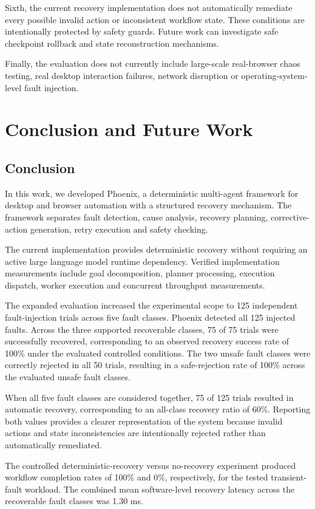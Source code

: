 \documentclass[conference]{IEEEtran}
\begin{document}
Sixth, the current recovery implementation does not automatically remediate every possible invalid action or inconsistent workflow state. These conditions are intentionally protected by safety guards. Future work can investigate safe checkpoint rollback and state reconstruction mechanisms.

Finally, the evaluation does not currently include large-scale real-browser chaos testing, real desktop interaction failures, network disruption or operating-system-level fault injection.

\section{Conclusion and Future Work}
\subsection{Conclusion}
In this work, we developed Phoenix, a deterministic multi-agent framework for desktop and browser automation with a structured recovery mechanism. The framework separates fault detection, cause analysis, recovery planning, corrective-action generation, retry execution and safety checking.

The current implementation provides deterministic recovery without requiring an active large language model runtime dependency. Verified implementation measurements include goal decomposition, planner processing, execution dispatch, worker execution and concurrent throughput measurements.

The expanded evaluation increased the experimental scope to 125 independent fault-injection trials across five fault classes. Phoenix detected all 125 injected faults. Across the three supported recoverable classes, 75 of 75 trials were successfully recovered, corresponding to an observed recovery success rate of 100\% under the evaluated controlled conditions. The two unsafe fault classes were correctly rejected in all 50 trials, resulting in a safe-rejection rate of 100\% across the evaluated unsafe fault classes.

When all five fault classes are considered together, 75 of 125 trials resulted in automatic recovery, corresponding to an all-class recovery ratio of 60\%. Reporting both values provides a clearer representation of the system because invalid actions and state inconsistencies are intentionally rejected rather than automatically remediated.

The controlled deterministic-recovery versus no-recovery experiment produced workflow completion rates of 100\% and 0\%, respectively, for the tested transient-fault workload. The combined mean software-level recovery latency across the recoverable fault classes was 1.30 ms.
\end{document}
